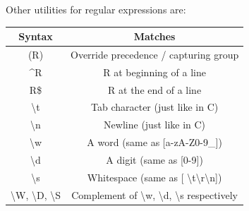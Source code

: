 \documentclass[12pt, a4paper]{report}
\begin{document}
    Other utilities for regular expressions are: 
    \begin{table}[H]
        \centering
        \begin{tabular}{cc}
        \hline
        \textbf{Syntax}                                         & \textbf{Matches}                                                                   \\ \hline
        (R)                                                     & Override precedence / capturing group                                              \\
        \textasciicircum{}R                                     & R at beginning of a line                                                           \\
        R\$                                                     & R at the end of a line                                                             \\
        \textbackslash{}t                                       & Tab character (just like in C)                                                     \\
        \textbackslash{}n                                       & Newline (just like in C)                                                           \\
        \textbackslash{}w                                       & A word (same as {[}a-zA-Z0-9\_{]})                                                 \\
        \textbackslash{}d                                       & A digit (same as {[}0-9{]})                                                        \\
        \textbackslash{}s                                       & Whitespace (same as {[} \textbackslash{}t\textbackslash{}r\textbackslash{}n{]})    \\
        \textbackslash{}W, \textbackslash{}D, \textbackslash{}S & Complement of \textbackslash{}w, \textbackslash{}d, \textbackslash{}s respectively \\ \hline
        \end{tabular}
    \end{table}
\end{document}
